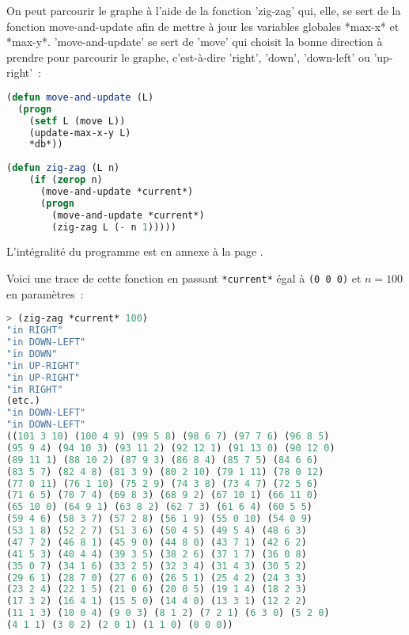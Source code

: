 \documentclass{article}
\begin{document}
On peut parcourir le graphe à l'aide de la fonction 'zig-zag' qui, elle, se sert de la fonction move-and-update afin de mettre à jour les variables globales *max-x* et *max-y*. 'move-and-update' se sert de 'move' qui choisit la bonne direction à prendre pour parcourir le graphe, c'est-à-dire 'right', 'down', 'down-left' ou 'up-right'~:

\begin{lstlisting}[language=Lisp]
(defun move-and-update (L)
  (progn
    (setf L (move L))
    (update-max-x-y L)
    *db*))
 
(defun zig-zag (L n)
    (if (zerop n) 
      (move-and-update *current*)
      (progn
        (move-and-update *current*)
        (zig-zag L (- n 1)))))
\end{lstlisting}



L'intégralité du programme est en annexe à la page \pageref{coupleslisp}.

Voici une trace de cette fonction en passant \lstinline!*current*! égal à \lstinline!(0 0 0)! et $n = 100$ en paramètres~:

\begin{lstlisting}[language=Lisp]
> (zig-zag *current* 100)
"in RIGHT" 
"in DOWN-LEFT" 
"in DOWN" 
"in UP-RIGHT" 
"in UP-RIGHT" 
"in RIGHT" 
(etc.)
"in DOWN-LEFT" 
"in DOWN-LEFT" 
((101 3 10) (100 4 9) (99 5 8) (98 6 7) (97 7 6) (96 8 5) 
(95 9 4) (94 10 3) (93 11 2) (92 12 1) (91 13 0) (90 12 0) 
(89 11 1) (88 10 2) (87 9 3) (86 8 4) (85 7 5) (84 6 6) 
(83 5 7) (82 4 8) (81 3 9) (80 2 10) (79 1 11) (78 0 12) 
(77 0 11) (76 1 10) (75 2 9) (74 3 8) (73 4 7) (72 5 6) 
(71 6 5) (70 7 4) (69 8 3) (68 9 2) (67 10 1) (66 11 0) 
(65 10 0) (64 9 1) (63 8 2) (62 7 3) (61 6 4) (60 5 5) 
(59 4 6) (58 3 7) (57 2 8) (56 1 9) (55 0 10) (54 0 9) 
(53 1 8) (52 2 7) (51 3 6) (50 4 5) (49 5 4) (48 6 3) 
(47 7 2) (46 8 1) (45 9 0) (44 8 0) (43 7 1) (42 6 2) 
(41 5 3) (40 4 4) (39 3 5) (38 2 6) (37 1 7) (36 0 8) 
(35 0 7) (34 1 6) (33 2 5) (32 3 4) (31 4 3) (30 5 2) 
(29 6 1) (28 7 0) (27 6 0) (26 5 1) (25 4 2) (24 3 3) 
(23 2 4) (22 1 5) (21 0 6) (20 0 5) (19 1 4) (18 2 3) 
(17 3 2) (16 4 1) (15 5 0) (14 4 0) (13 3 1) (12 2 2) 
(11 1 3) (10 0 4) (9 0 3) (8 1 2) (7 2 1) (6 3 0) (5 2 0) 
(4 1 1) (3 0 2) (2 0 1) (1 1 0) (0 0 0))
\end{lstlisting}
\end{document}

